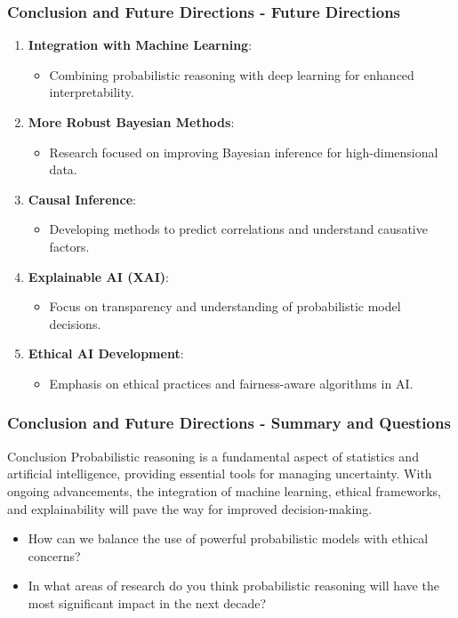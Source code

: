 \documentclass[aspectratio=169]{beamer}
\begin{document}
\begin{frame}[fragile]
  \frametitle{Conclusion and Future Directions - Future Directions}
  \begin{enumerate}
    \item \textbf{Integration with Machine Learning}:
      \begin{itemize}
        \item Combining probabilistic reasoning with deep learning for enhanced interpretability.
      \end{itemize}
    
    \item \textbf{More Robust Bayesian Methods}:
      \begin{itemize}
        \item Research focused on improving Bayesian inference for high-dimensional data.
      \end{itemize}
    
    \item \textbf{Causal Inference}:
      \begin{itemize}
        \item Developing methods to predict correlations and understand causative factors.
      \end{itemize}
    
    \item \textbf{Explainable AI (XAI)}:
      \begin{itemize}
        \item Focus on transparency and understanding of probabilistic model decisions.
      \end{itemize}
    
    \item \textbf{Ethical AI Development}:
      \begin{itemize}
        \item Emphasis on ethical practices and fairness-aware algorithms in AI.
      \end{itemize}
  \end{enumerate}
\end{frame}

\begin{frame}[fragile]
  \frametitle{Conclusion and Future Directions - Summary and Questions}
  \begin{block}{Conclusion}
    Probabilistic reasoning is a fundamental aspect of statistics and artificial intelligence, providing essential tools for managing uncertainty. With ongoing advancements, the integration of machine learning, ethical frameworks, and explainability will pave the way for improved decision-making.
  \end{block}
  \begin{itemize}
    \item How can we balance the use of powerful probabilistic models with ethical concerns?
    \item In what areas of research do you think probabilistic reasoning will have the most significant impact in the next decade?
  \end{itemize}
\end{frame}
\end{document}
